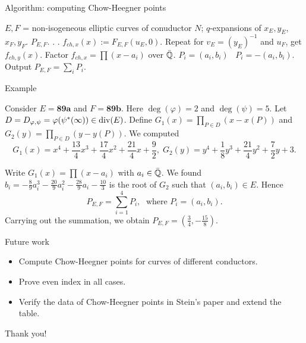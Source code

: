 \documentclass[handout]{beamer}
\begin{document}
\begin{frame}{Algorithm: computing Chow-Heegner points}
\begin{algorithm}[H]
\begin{algorithmic}              %
    \Require  $E, F$  = non-isogeneous elliptic curves of conuductor $N$;
    $q$-expansions of $x_E, y_E$, $x_F,y_F$.
    \Ensure $P_{E,F}$.
        .
    .
    \State $f_{ch,x}(x) := F_{E,F}(u_E,0)$.
    \State Repeat for $v_E = (y_E)^{-1}$ and $u_F$, get $f_{ch,y}(x)$.
    \State Factor $f_{ch,x} = \prod (x-a_i)$ over $\bar{\mathbb{Q}}$.
      $P_i = (a_i,b_i)$ \Else  \,  $P_i = - (a_i, b_i)$.
    \EndIf
    \EndFor
\State Output $P_{E,F} = \sum_i P_i$.
\end{algorithmic}
\end{algorithm}
\end{frame}

\begin{frame}{Example}

\begin{Example}
Consider $E = \textbf{89a}$ and $F = \textbf{89b}$. Here $\deg(\varphi) = 2$ and $\deg(\psi) = 5$. Let 
$D = D_{\varphi, \psi}= \varphi(\psi^*(\infty)) \in \operatorname{div}(E)$. Define $G_1(x) = \prod_{P \in D} (x - x(P))$ 
and $G_2(y) = \prod_{P \in D} (y - y(P))$. We computed 
\[
G_1(x) = x^{4} + \frac{13}{4} x^{3} + \frac{17}{4} x^{2} + \frac{21}{4} x + \frac{9}{2}, \; G_2(y) = y^{4} + \frac{1}{8} y^{3} + \frac{21}{4} y^{2} + \frac{7}{2} y + 3.
\]

Write $G_1(x) = \prod (x-a_i)$ with $a_i \in \bar{\mathbb{Q}}$. We found  $b_i = -\frac{8}{9} a_i^{3} - \frac{20}{9} a_i^{2} - \frac{28}{9} a_i - \frac{10}{3}$ is the root of $G_2$ such that $(a_i,b_i) \in E$. Hence 
	$$P_{E,F} = \sum_{i=1}^4 P_i, \; \mbox{ where } P_i = (a_i, b_i).$$
Carrying out the summation, we obtain $P_{E,F} = (\frac{3}{4},-\frac{15}{8})$. 

\end{Example}


\end{frame}

\begin{frame}{Future work}

\begin{itemize}
\item Compute Chow-Heegner points for curves of different conductors. 
\item Prove even index in all cases. 
\item Verify the data of Chow-Heegner points in Stein's paper and extend the table.
\end{itemize}

\end{frame}

\begin{frame}
\Huge{\centerline{Thank you!}}
\end{frame}
\end{document}
